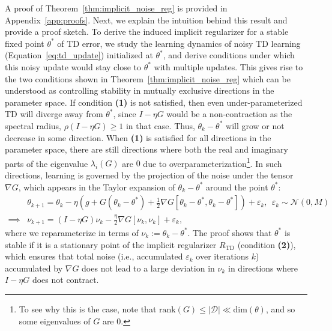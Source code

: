 A proof of Theorem~\ref{thm:implicit_noise_reg} is provided in Appendix~\ref{app:proofs}. Next, we explain the intuition behind this result and provide a proof sketch. To derive the induced implicit regularizer for a stable fixed point $\theta^*$ of TD error, we study the learning dynamics of noisy TD learning (Equation~\ref{eq:td_update}) initialized at $\theta^*$, and derive conditions under which this noisy update would stay close to $\theta^*$ with multiple updates.  This gives rise to the two conditions shown in Theorem~\ref{thm:implicit_noise_reg} which can be understood as controlling stability in mutually exclusive directions in the parameter space. If condition \textbf{(1)} is not satisfied, then even under-parameterized TD will diverge away from $\theta^*$, since $I - \eta G$ would be a non-contraction as the spectral radius, $\rho(I - \eta G) \geq 1$ in that case. Thus, $\theta_k - \theta^*$ will grow or not decrease in some direction. When \textbf{(1)} is satisfied for all directions in the parameter space, there are still directions where both the real and imaginary parts of the eigenvalue $\lambda_i(G)$ are $0$ due to overparameterization\footnote{To see why this is the case, note that $\text{rank}(G) \leq |\mathcal{D}| \ll \text{dim}(\theta)$, and so some eigenvalues of $G$ are $0$.}. 
In such directions, learning is governed by the projection of the noise under the tensor  $\nabla G$,
which appears in the Taylor expansion of $\theta_k - \theta^*$ around the point $\theta^*$:
\begin{align}
    \label{eqn:nu_k}
    &\theta_{k+1} = \theta_k - \eta \left(g + G (\theta_k - \theta^*) + \frac{1}{2} \nabla G [\theta_k -\theta^*, \theta_k - \theta^*] \right) + \varepsilon_k, ~~ \varepsilon_k \sim \mathcal{N}(0, M)\\
    \implies &\nu_{k+1} = (I - \eta G )\nu_k  - \frac{\eta}{2} \nabla G [\nu_k, \nu_k] + \varepsilon_k,
    \label{eqn:nu_k_actual}
\end{align}
where we reparameterize in terms of $\nu_k := \theta_k - \theta^*$. The proof shows that $\theta^*$ is stable if it is a stationary point of the implicit regularizer $R_\mathrm{TD}$ (condition \textbf{(2)}), which ensures that total noise (i.e., accumulated $\varepsilon_k$ over iterations $k$) accumulated by $\nabla G$ does not lead to a large deviation in $\nu_k$ in directions where $I - \eta G$ does not contract. 

